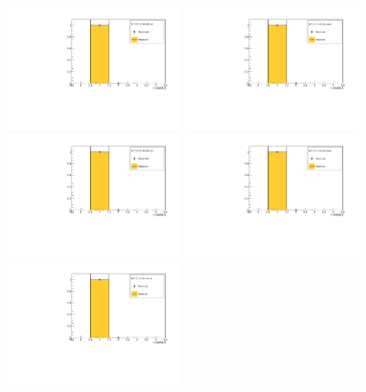 \begin{figure}[!tbh]
    \centering
    \includegraphics*[width=0.45\textwidth]{02-Cuts/Figures/2017-2.7_3-140_lH2_full/tku_n_tracks_us_cut.pdf}
    \includegraphics*[width=0.45\textwidth]{02-Cuts/Figures/2017-2.7_3-140_lH2_empty/tku_n_tracks_us_cut.pdf}
    \includegraphics*[width=0.45\textwidth]{02-Cuts/Figures/2017-2.7_6-140_lH2_full/tku_n_tracks_us_cut.pdf}
    \includegraphics*[width=0.45\textwidth]{02-Cuts/Figures/2017-2.7_6-140_lH2_empty/tku_n_tracks_us_cut.pdf}
    \includegraphics*[width=0.45\textwidth]{02-Cuts/Figures/2017-2.7_10-140_lH2_full/tku_n_tracks_us_cut.pdf}

\end{figure}

